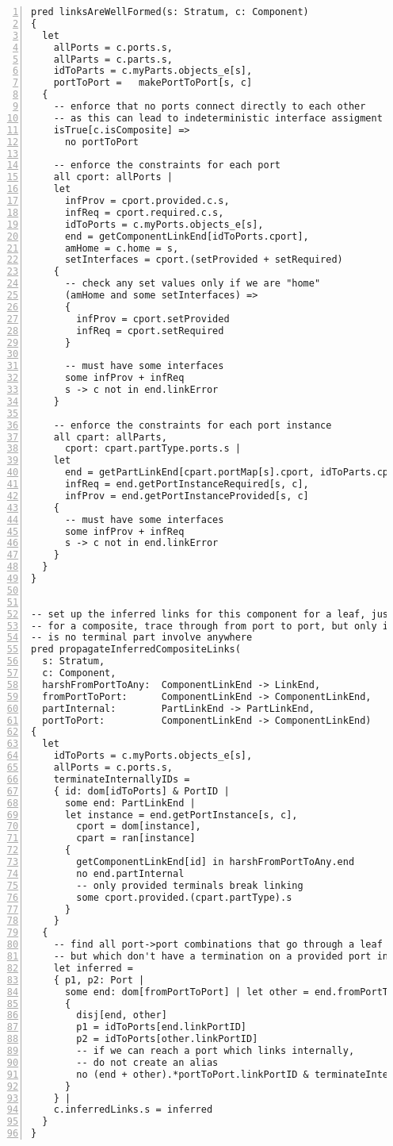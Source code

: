 \begin{lstlisting}[caption={port\_inference.als}, numbers=left]
pred linksAreWellFormed(s: Stratum, c: Component)
{
  let
    allPorts = c.ports.s,
    allParts = c.parts.s,
    idToParts = c.myParts.objects_e[s],
    portToPort =   makePortToPort[s, c]
  {
    -- enforce that no ports connect directly to each other
    -- as this can lead to indeterministic interface assigment
    isTrue[c.isComposite] =>
      no portToPort

    -- enforce the constraints for each port
    all cport: allPorts |
    let
      infProv = cport.provided.c.s,
      infReq = cport.required.c.s,
      idToPorts = c.myPorts.objects_e[s],
      end = getComponentLinkEnd[idToPorts.cport],
      amHome = c.home = s,
      setInterfaces = cport.(setProvided + setRequired)
    {
      -- check any set values only if we are "home"
      (amHome and some setInterfaces) =>
      {
        infProv = cport.setProvided
        infReq = cport.setRequired
      }
      
      -- must have some interfaces
      some infProv + infReq
      s -> c not in end.linkError
    }

    -- enforce the constraints for each port instance
    all cpart: allParts,
      cport: cpart.partType.ports.s |
    let
      end = getPartLinkEnd[cpart.portMap[s].cport, idToParts.cpart],
      infReq = end.getPortInstanceRequired[s, c],
      infProv = end.getPortInstanceProvided[s, c]
    {
      -- must have some interfaces
      some infProv + infReq
      s -> c not in end.linkError
    }
  }
}


-- set up the inferred links for this component for a leaf, just use the links
-- for a composite, trace through from port to port, but only infer a link if there
-- is no terminal part involve anywhere
pred propagateInferredCompositeLinks(
  s: Stratum,
  c: Component,  
  harshFromPortToAny:  ComponentLinkEnd -> LinkEnd,
  fromPortToPort:      ComponentLinkEnd -> ComponentLinkEnd,
  partInternal:        PartLinkEnd -> PartLinkEnd,
  portToPort:          ComponentLinkEnd -> ComponentLinkEnd)
{
  let
    idToPorts = c.myPorts.objects_e[s],
    allPorts = c.ports.s,
    terminateInternallyIDs =
    { id: dom[idToPorts] & PortID |
      some end: PartLinkEnd |
      let instance = end.getPortInstance[s, c],
        cport = dom[instance],
        cpart = ran[instance]
      {
        getComponentLinkEnd[id] in harshFromPortToAny.end
        no end.partInternal
        -- only provided terminals break linking
        some cport.provided.(cpart.partType).s
      }
    }
  {
    -- find all port->port combinations that go through a leaf part and link up
    -- but which don't have a termination on a provided port instance interface
    let inferred =
    { p1, p2: Port |
      some end: dom[fromPortToPort] | let other = end.fromPortToPort
      {
        disj[end, other]
        p1 = idToPorts[end.linkPortID]
        p2 = idToPorts[other.linkPortID]
        -- if we can reach a port which links internally,
        -- do not create an alias
        no (end + other).*portToPort.linkPortID & terminateInternallyIDs
      }
    } |
    c.inferredLinks.s = inferred
  }
}
\end{lstlisting}